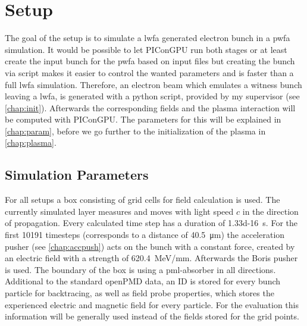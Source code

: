 \documentclass[bachelor_thesis]{subfiles}
\begin{document}
\chapter{Setup}
The goal of the setup is to simulate a \gls{lwfa} generated electron bunch in a \gls{pwfa} simulation. It would be possible to let PIConGPU run both stages or at least create the input bunch for the \gls{pwfa} based on input files
but creating the bunch via script makes it easier to control the wanted parameters and is faster than a full \gls{lwfa} simulation. Therefore, an electron beam which emulates a witness bunch leaving a \gls{lwfa}, is generated with a python script,
provided by my supervisor (see \autoref{chap:init}). Afterwards the corresponding fields and the plasma interaction will be computed with PIConGPU. The parameters for this will  be explained in \autoref{chap:param}, 
before we go further to the initialization of the plasma in \autoref{chap:plasma}.


\section{Simulation Parameters}\label{chap:param}
For all setups a box consisting of  grid cells for field calculation is used. The currently simulated layer measures  and moves with light speed $c$ in the direction of propagation.
Every calculated time step has a duration of \qty{1.33d-16}{\s}. For the first \num{10191} timesteps (corresponds to a distance of \qty{40.5}{\um}) the acceleration pusher (see \autoref{chap:accpush}) acts on the bunch with a constant force, 
created by an electric field with a strength of \qty{620.4}{\MeV/\mm}. Afterwards the Boris pusher is used. The boundary of the box is using a \gls{pml}-absorber in all directions. Additional to the standard openPMD data, an ID is stored for every bunch particle for backtracing,
as well as field probe properties, which stores the experienced electric and magnetic field for every particle. For the evaluation this information will be generally used instead of the fields stored for the grid points.
\end{document}
